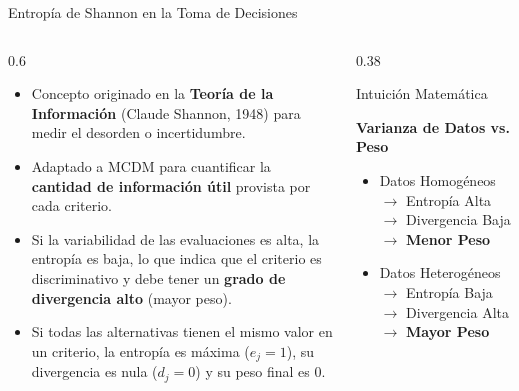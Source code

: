 \documentclass[aspectratio=169, 10pt]{beamer}
\begin{document}
\begin{frame}{Entropía de Shannon en la Toma de Decisiones}
    \begin{columns}[T]
        \begin{column}{0.6\textwidth}
            \begin{itemize}
                \item Concepto originado en la \textbf{Teoría de la Información} (Claude Shannon, 1948) para medir el desorden o incertidumbre.
                \item Adaptado a MCDM para cuantificar la \textbf{cantidad de información útil} provista por cada criterio.
                \item Si la variabilidad de las evaluaciones es alta, la entropía es baja, lo que indica que el criterio es discriminativo y debe tener un \textbf{grado de divergencia alto} (mayor peso).
                \item Si todas las alternativas tienen el mismo valor en un criterio, la entropía es máxima ($e_j = 1$), su divergencia es nula ($d_j = 0$) y su peso final es 0.
            \end{itemize}
        \end{column}
        
        \begin{column}{0.38\textwidth}
            \begin{block}{Intuición Matemática}
                \scriptsize
                \begin{center}
                    \textbf{Varianza de Datos vs. Peso}
                \end{center}
                \begin{itemize}
                    \item Datos Homogéneos $\rightarrow$ Entropía Alta $\rightarrow$ Divergencia Baja $\rightarrow$ \textbf{Menor Peso}
                    \item Datos Heterogéneos $\rightarrow$ Entropía Baja $\rightarrow$ Divergencia Alta $\rightarrow$ \textbf{Mayor Peso}
                \end{itemize}
            \end{block}
        \end{column}
    \end{columns}
\end{frame}
\end{document}
